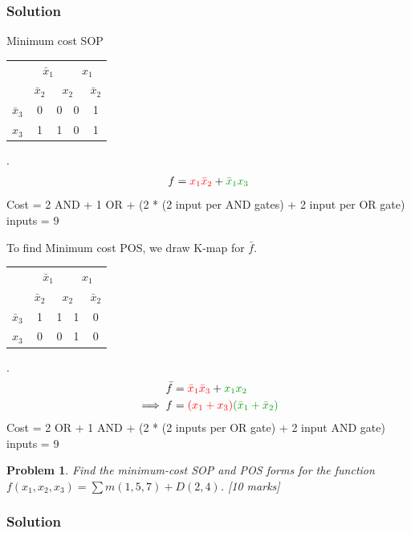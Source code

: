 \documentclass{article}
\newtheorem{prob}{Problem}
\newcommand{\bx}{\bar{x}}
\newcommand{\cred}{\color{red}}
\newcommand{\cg}{\color{green!60!black}}
\begin{document}
\subsubsection*{Solution}

Minimum cost SOP
\\
\begin{tabular}{c|c|c|c|c}
  \toprule
  & \multicolumn{2}{c|}{$\bx_1$} & \multicolumn{2}{c}{$x_1$}
  \\
  & $\bx_2$ & \multicolumn{2}{c|}{$x_2$} & $\bx_2$
  \\ \midrule
  $\bx_3$
  & 0 & 0 & 0 & {\color{red}1}
  \\
  $x_3$
  & {\color{green}1} & {\color{green}1} & 0 & {\color{red}1}
  \\\bottomrule
\end{tabular}.
\\
\begin{align}
  f = {\cred x_1 \bx_2} + {\cg \bx_1 x_3}
\end{align}
Cost = 2 AND  + 1 OR + (2 * (2 input per AND gates) + 2 input per OR gate) inputs = 9

To find Minimum cost POS, we draw K-map for $\bar{f}$.
\\
\begin{tabular}{c|c|c|c|c}
  \toprule
  & \multicolumn{2}{c|}{$\bx_1$} & \multicolumn{2}{c}{$x_1$}
  \\
  & $\bx_2$ & \multicolumn{2}{c|}{$x_2$} & $\bx_2$
  \\ \midrule
  $\bx_3$
  & \cred 1 & \cred 1 & \cg 1 & 0
  \\
  $x_3$
  & 0 & 0 & \cg 1 & 0
  \\\bottomrule
\end{tabular}.
\\
\begin{align}
  \bar{f} &= {\cred \bx_1 \bx_3} + {\cg x_1 x_2 }
  \\
  \implies f &= {\cred (x_1 + x_3)}{\cg (\bx_1 + \bx_2) }
\end{align}
Cost = 2 OR + 1 AND + (2 * (2 inputs per OR gate) + 2 input AND gate) inputs = 9

\begin{prob}
Find the minimum-cost SOP and POS forms for the function $f(x_1 , x_2 , x_3) =
\sum m(1, 5, 7) + D(2, 4)$. \cite[Prob 2.38]{brown2013fundamentals} [10 marks]
\end{prob}

\subsubsection*{Solution}
\end{document}
